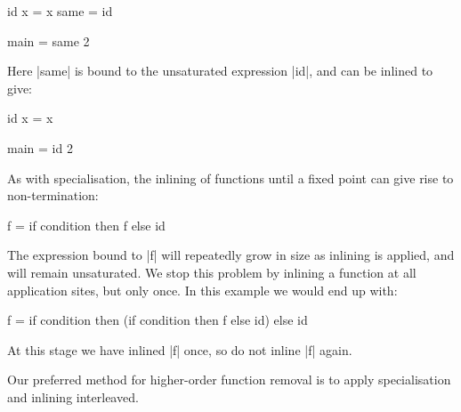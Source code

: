 \begin{example}
\begin{code}
id x = x
same = id

main = same 2
\end{code}

Here |same| is bound to the unsaturated expression |id|, and can be inlined to give:

\begin{code}
id x = x

main = id 2
\end{code}
\end{example}

As with specialisation, the inlining of functions until a fixed point can give rise to non-termination:

\begin{example}
\begin{code}
f = if condition then f else id
\end{code}

The expression bound to |f| will repeatedly grow in size as inlining is applied, and will remain unsaturated. We stop this problem by inlining a function at all application sites, but only once. In this example we would end up with:

\begin{code}
f = if condition then (if condition then f else id) else id
\end{code}

At this stage we have inlined |f| once, so do not inline |f| again.
\end{example}

Our preferred method for higher-order function removal is to apply specialisation and inlining interleaved.

